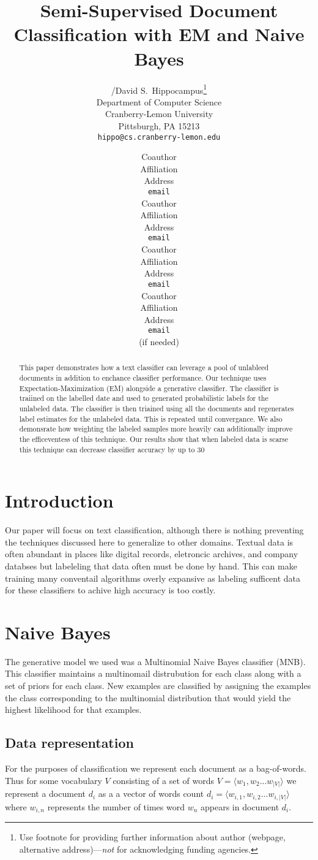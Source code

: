 \documentclass{article} %
\title{Semi-Supervised Document Classification with EM and Naive Bayes}
\author{
/David S.~Hippocampus\thanks{ Use footnote for providing further information
about author (webpage, alternative address)---\emph{not} for acknowledging
funding agencies.} \\
Department of Computer Science\\
Cranberry-Lemon University\\
Pittsburgh, PA 15213 \\
\texttt{hippo@cs.cranberry-lemon.edu} \\
\and
Coauthor \\
Affiliation \\
Address \\
\texttt{email} \\
\AND
Coauthor \\
Affiliation \\
Address \\
\texttt{email} \\
\And
Coauthor \\
Affiliation \\
Address \\
\texttt{email} \\
\And
Coauthor \\
Affiliation \\
Address \\
\texttt{email} \\
(if needed)\\
}
\begin{document}
\maketitle

\begin{abstract}
This paper demonstrates how a text classifier can leverage a pool of unlableed documents in addition 
to enchance classifier performance. Our technique uses Expectation-Maximization (EM) alongside a generative
classifier. The classifier is traiined on the labelled date and used to generated probabilistic labels for the unlabeled
data. The classifier is then triained using all the documents and regenerates label estimates for the unlabeled data.
This is repeated until convergance. We also demonsrate how weighting the labeled samples more heavily 
can additionally improve the efficeventess of this technique. Our results show that when labeled data is scarse
this technique can decrease classifier accuracy by up to 30%
\end{abstract}

\section{Introduction}
Our paper will focus on text classification, although there is nothing preventing the techniques discussed here to 
generalize to other domains. Textual data is often abundant in places like digital records, eletroncic archives, 
and company databses but labeleling that data often must be done by hand. This can make training many
conventail algorithms overly expansive as labeling sufficent data for 
these classifiers to achive high accuracy is too costly. 

\section{Naive Bayes}
The generative model we used was a Multinomial Naive Bayes classifier (MNB). This classifier 
maintains a multinomail distrubution for each class along with a set of priors for each class. New
examples are classified by assigning the examples the class corresponding to the multinomial distribution that would
yield the highest likelihood for that examples. 
\subsection{Data representation}
For the purposes of classification we represent each document as a bag-of-words. Thus for some vocabulary $V$ consisting of
a set of words $V = \langle{w_1,w_2...w_{|V|}}\rangle$ we represent a document $d_i$ as a
a vector of words count $d_i = \langle{w_{i,1},w_{i,2}...w_{i,|V|}}\rangle$ where $w_{i,n}$ represents
the number of times word $w_n$ appears in document  $d_i$.
 
\end{document}
